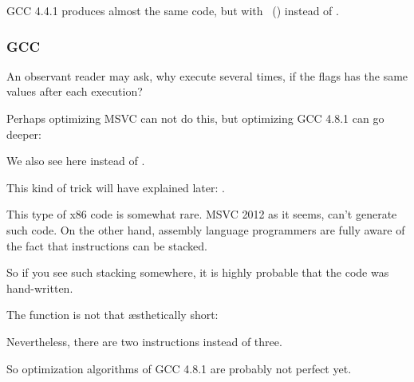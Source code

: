 \NonOptimizing GCC 4.4.1 
produces almost the same code, but with \puts~() instead of \printf.

\subsubsection{\Optimizing GCC}

An observant reader may ask, why execute \CMP several times, 
if the flags has the same values after each execution?

Perhaps optimizing MSVC can not do this, but optimizing GCC 4.8.1 can go deeper:



We also see  here instead of .

This kind of trick will have explained later: .

This type of x86 code 
is somewhat rare.
MSVC 2012 as it seems, can't generate such code.
On the other hand, assembly language programmers are fully aware of the fact that  
instructions can be stacked.

So if you see such stacking somewhere, it is highly probable that the code was hand-written.

The  function is not that 
\ae{}sthetically short:



Nevertheless, there are two  instructions instead of three.

So optimization algorithms of GCC 4.8.1 are probably not perfect yet. 
